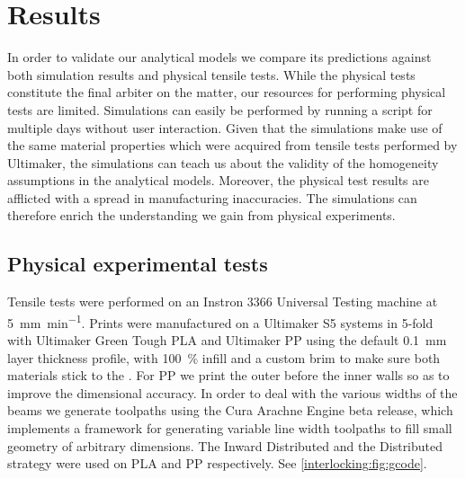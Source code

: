 \section{Results}\label{interlocking:sec:validation}
In order to validate our analytical models we compare its predictions against both simulation results and physical tensile tests.
While the physical tests constitute the final arbiter on the matter,
our resources for performing physical tests are limited.
Simulations can easily be performed by running a script for multiple days without user interaction.
Given that the simulations make use of the same material properties which were acquired from tensile tests performed by Ultimaker,
the simulations can teach us about the validity of the homogeneity assumptions in the analytical models.
Moreover, the physical test results are afflicted with a spread in manufacturing inaccuracies.
The simulations can therefore enrich the understanding we gain from physical experiments.







\subsection{Physical experimental tests}
Tensile tests were performed on an Instron 3366 Universal Testing machine at \SI{5}{\milli\meter\per\minute}.
Prints were manufactured on a Ultimaker S5 systems in 5-fold with Ultimaker Green Tough PLA and Ultimaker PP using the default \SI{0.1}{\milli\meter} layer thickness profile,
with \SI{100}{\percent} infill and a custom brim to make sure both materials stick to the .
For PP we print the outer before the inner walls so as to improve the dimensional accuracy. %
In order to deal with the various widths of the beams we generate toolpaths using the Cura Arachne Engine beta release\cite{CuraArachne},
which implements a framework for generating variable line width toolpaths to fill small geometry of arbitrary dimensions\cite{Kuipers2020}.
The Inward Distributed and the Distributed strategy were used on PLA and PP respectively.
See \cref{interlocking:fig:gcode}.



